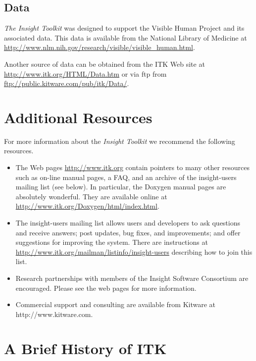 \subsection{Data}
\label{sec:Data}

\emph{The Insight Toolkit} was designed to support the Visible Human Project 
and its associated data. This data is available from the National Library of
Medicine at \url{http://www.nlm.nih.gov/research/visible/visible\_human.html}.

Another source of data can be obtained from the ITK Web site at 
\url{http://www.itk.org/HTML/Data.htm} or via ftp from
\url{ftp://public.kitware.com/pub/itk/Data/}.

\section{Additional Resources}
\label{sec:AdditionalResources}

For more information about the \emph{Insight Toolkit} we recommend the
following resources.

\begin{itemize}
	\item The Web pages \url{http://www.itk.org} contain pointers to
	many other resources such as on-line manual pages, a FAQ, and an
	archive of the insight-users mailing list (see below). In particular,
	the Doxygen manual pages are absolutely wonderful. They are 
        available online at \url{http://www.itk.org/Doxygen/html/index.html}.

	\item The insight-users mailing list allows users and developers to ask
	questions and receive answers; post updates, bug fixes, and
	improvements; and offer suggestions for improving the system. There
	are instructions at 
        \url{http://www.itk.org/mailman/listinfo/insight-users}
	describing how to join this list.

        \item Research partnerships with members of the Insight Software
        Consortium are encouraged. Please see the web pages for more 
        information.

	\item Commercial support and consulting are available from Kitware at
	http://www.kitware.com. 
\end{itemize}

\section{A Brief History of ITK}
\label{sec:History}

